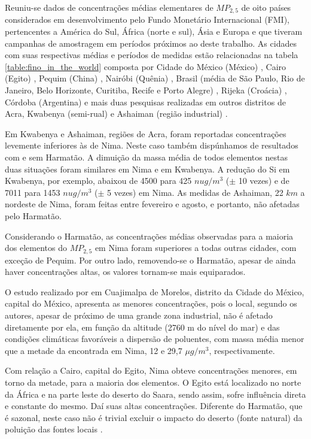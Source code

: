 Reuniu-se dados de concentrações médias elementares de $MP_{2,5}$ de oito 
países considerados em desenvolvimento pelo Fundo Monetário Internacional (FMI),
pertencentes a América do Sul, África (norte e sul), Ásia e Europa e que tiveram
campanhas de amostragem em períodos próximos ao deste trabalho. As cidades
com suas respectivas médias e períodos de medidas estão relacionadas na 
tabela \ref{table:fino_in_the_world} composta por  
Cidade do México (México) \citep{diaz2014},
Cairo (Egito) \citep{boman2013},
Pequim (China) \citep{yang2011},
Nairóbi (Quênia)  \citep{gaita2014},
Brasil (média de São Paulo, Rio de Janeiro, Belo Horizonte, Curitiba, 
Recife e Porto Alegre)  \citep{andrade2012urban},
Rijeka (Croácia) \citep{ivovsevic2015}, 
Córdoba (Argentina) \citep{achad2014} e mais duas pesquisas realizadas em 
outros distritos de Acra, Kwabenya (semi-rual) \citep{aboh2009} e Ashaiman
(região industrial) \citep{ofosu2012}. 

Em Kwabenya e Ashaiman, regiões de Acra, foram reportadas concentrações 
levemente inferiores às de Nima. Neste caso também dispúnhamos de resultados 
com e sem Harmatão. A dimuição da massa média de todos elementos nestas duas 
situações foram similares em Nima e em Kwabenya. A redução do Si em Kwabenya, 
por exemplo, abaixou de 4500 para 425 $nu g/m^3$ 
($\pm$ 10 vezes) e de 7011 para 1453 $nu g/m^3$ ($\pm$ 5 vezes) em Nima. 
As medidas de Ashaiman, 22 $km$ a nordeste de Nima, foram feitas entre 
fevereiro e agosto, e portanto, não afetadas pelo Harmatão.

Considerando o Harmatão, as concentrações médias observadas para a maioria dos 
elementos do $MP_{2,5}$ em Nima foram superiores a todas outras cidades, com 
exceção de Pequim. Por outro lado, removendo-se o Harmatão, apesar de ainda 
haver concentrações altas, os valores tornam-se mais equiparados. 

O estudo realizado por \citet{diaz2014} em Cuajimalpa de Morelos, distrito 
da Cidade do México, capital do México, apresenta as menores concentrações, 
pois o local, segundo os autores, apesar de próximo de uma grande zona industrial, 
não é afetado diretamente por ela, em função da altitude (2760 m do nível do mar)
e das condições climáticas favoráveis a dispersão de poluentes, com massa média 
menor que a metade da encontrada em Nima, 12 e 29,7 $\mu g/m^3$, respectivamente.

Com relação a Cairo, capital do Egito, Nima obteve concentrações menores, 
em torno da metade, para a maioria dos elementos. O Egito está localizado 
no norte da África e na parte leste do deserto do Saara, sendo assim,
sofre influência direta e constante do mesmo. Daí suas altas concentrações. 
Diferente do Harmatão, que é sazonal, neste caso não é trivial excluir o impacto 
do deserto (fonte natural) da poluição das fontes locais \citet{boman2013}.


